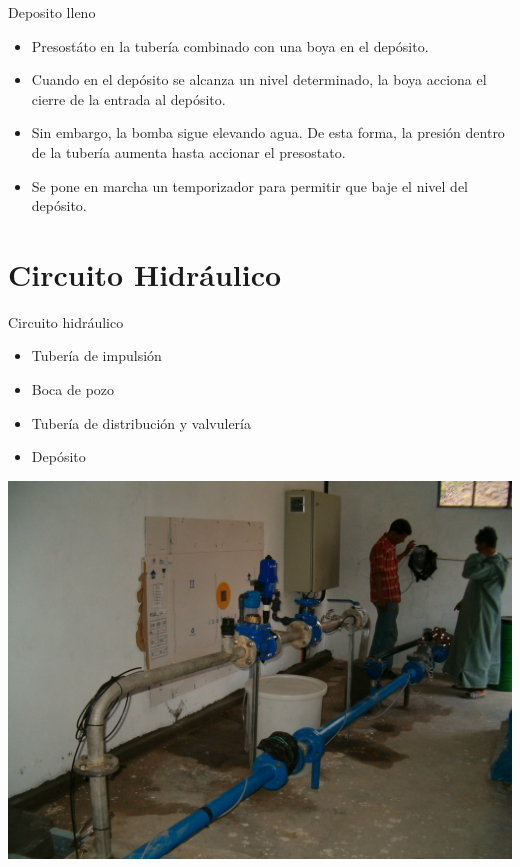 \documentclass[xcolor={usenames,svgnames,dvipsnames}]{beamer}
\begin{document}
\begin{frame}[label={sec:orgb288967}]{Deposito lleno}
\begin{itemize}
\item \alert{Presostáto en la tubería combinado con una boya en el depósito}.

\item Cuando en el depósito se alcanza un nivel determinado, la boya acciona el cierre de la entrada al depósito.

\item Sin embargo, la bomba sigue elevando agua. De esta forma, la presión dentro de la tubería aumenta hasta accionar el presostato.

\item Se pone en marcha un temporizador para permitir que baje el nivel del depósito.
\end{itemize}
\end{frame}


\section{Circuito Hidráulico}
\label{sec:org17ce85f}

\begin{frame}[label={sec:org9d3aa54}]{Circuito hidráulico}
\begin{itemize}
\item Tubería de impulsión

\item Boca de pozo

\item Tubería de distribución y valvulería

\item Depósito
\end{itemize}
\end{frame}

\begin{frame}[label={sec:org44c5d92}]{}
\begin{center}
\includegraphics[width=.9\linewidth]{../figs/CircuitoHidraulico.jpg}
\end{center}
\end{frame}
\end{document}
